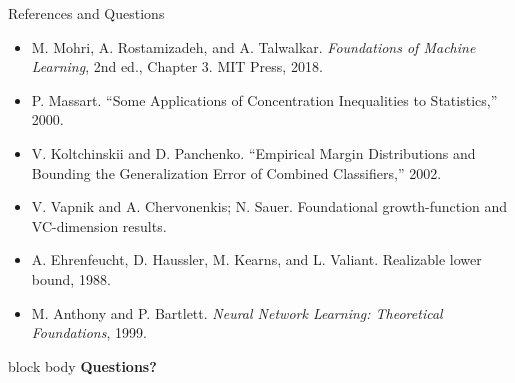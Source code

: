 \documentclass[aspectratio=169,10pt]{beamer}
\begin{document}
\begin{frame}[t]{References and Questions}
  \vspace{0.01cm}
  {\small
  \begin{itemize}
    \setlength{\itemsep}{0.07cm}
    \item M. Mohri, A. Rostamizadeh, and A. Talwalkar. \emph{Foundations of Machine Learning}, 2nd ed., Chapter 3. MIT Press, 2018.
    \item P. Massart. ``Some Applications of Concentration Inequalities to Statistics,'' 2000.
    \item V. Koltchinskii and D. Panchenko. ``Empirical Margin Distributions and Bounding the Generalization Error of Combined Classifiers,'' 2002.
    \item V. Vapnik and A. Chervonenkis; N. Sauer. Foundational growth-function and VC-dimension results.
    \item A. Ehrenfeucht, D. Haussler, M. Kearns, and L. Valiant. Realizable lower bound, 1988.
    \item M. Anthony and P. Bartlett. \emph{Neural Network Learning: Theoretical Foundations}, 1999.
  \end{itemize}}
  \vspace{0.10cm}
  \begin{beamercolorbox}[rounded=true,sep=0.22cm,wd=\linewidth,center]{block body}
    {\fontsize{23}{28}\selectfont\bfseries Questions?}
  \end{beamercolorbox}
\end{frame}
\end{document}
